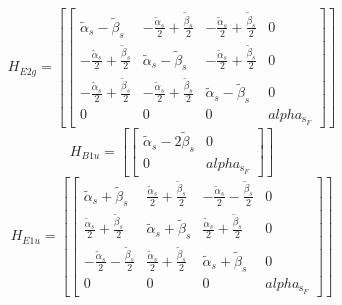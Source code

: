 \documentclass[12pt,a4paper]{article}
\begin{document}
     $$ H_{E2g}= \left[\begin{bmatrix}\tilde{\alpha}_{s} - \tilde{\beta}_{s} & - \frac{\tilde{\alpha}_{s}}{2} + \frac{\tilde{\beta}_{s}}{2} & - \frac{\tilde{\alpha}_{s}}{2} + \frac{\tilde{\beta}_{s}}{2} & 0\\- \frac{\tilde{\alpha}_{s}}{2} + \frac{\tilde{\beta}_{s}}{2} & \tilde{\alpha}_{s} - \tilde{\beta}_{s} & - \frac{\tilde{\alpha}_{s}}{2} + \frac{\tilde{\beta}_{s}}{2} & 0\\- \frac{\tilde{\alpha}_{s}}{2} + \frac{\tilde{\beta}_{s}}{2} & - \frac{\tilde{\alpha}_{s}}{2} + \frac{\tilde{\beta}_{s}}{2} & \tilde{\alpha}_{s} - \tilde{\beta}_{s} & 0\\0 & 0 & 0 & alpha_{\text{s}_F}\end{bmatrix}\right]$$ 
     $$ H_{B1u}= \left[\begin{bmatrix}\tilde{\alpha}_{s} - 2 \tilde{\beta}_{s} & 0\\0 & alpha_{\text{s}_F}\end{bmatrix}\right]$$ 
     $$ H_{E1u}= \left[\begin{bmatrix}\tilde{\alpha}_{s} + \tilde{\beta}_{s} & \frac{\tilde{\alpha}_{s}}{2} + \frac{\tilde{\beta}_{s}}{2} & - \frac{\tilde{\alpha}_{s}}{2} - \frac{\tilde{\beta}_{s}}{2} & 0\\\frac{\tilde{\alpha}_{s}}{2} + \frac{\tilde{\beta}_{s}}{2} & \tilde{\alpha}_{s} + \tilde{\beta}_{s} & \frac{\tilde{\alpha}_{s}}{2} + \frac{\tilde{\beta}_{s}}{2} & 0\\- \frac{\tilde{\alpha}_{s}}{2} - \frac{\tilde{\beta}_{s}}{2} & \frac{\tilde{\alpha}_{s}}{2} + \frac{\tilde{\beta}_{s}}{2} & \tilde{\alpha}_{s} + \tilde{\beta}_{s} & 0\\0 & 0 & 0 & alpha_{\text{s}_F}\end{bmatrix}\right]$$ 
\end{document}
